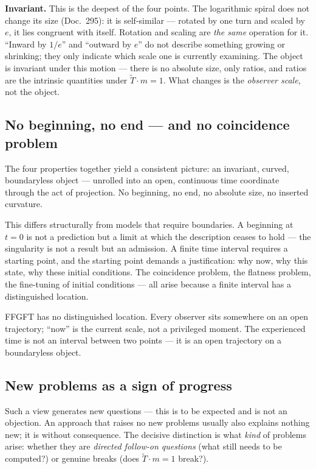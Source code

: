 \textbf{Invariant.} This is the deepest of the four points. The logarithmic
spiral does not change its size (Doc.~295): it is self-similar --- rotated by
one turn and scaled by $e$, it lies congruent with itself. Rotation and
scaling are \emph{the same} operation for it. \enquote{Inward by $1/e$} and
\enquote{outward by $e$} do not describe something growing or shrinking; they
only indicate which scale one is currently examining. The object is invariant
under this motion --- there is no absolute size, only ratios, and ratios are
the intrinsic quantities under $\tilde{T} \cdot m = 1$. What changes is the
\emph{observer scale}, not the object.

\subsection*{No beginning, no end --- and no coincidence problem}

The four properties together yield a consistent picture: an invariant, curved,
boundaryless object --- unrolled into an open, continuous time coordinate
through the act of projection. No beginning, no end, no absolute size, no
inserted curvature.

This differs structurally from models that require boundaries. A beginning at
$t = 0$ is not a prediction but a limit at which the description ceases to
hold --- the singularity is not a result but an admission. A finite time
interval requires a starting point, and the starting point demands a
justification: why now, why this state, why these initial conditions. The
coincidence problem, the flatness problem, the fine-tuning of initial
conditions --- all arise because a finite interval has a distinguished location.

FFGFT has no distinguished location. Every observer sits somewhere on an open
trajectory; \enquote{now} is the current scale, not a privileged moment. The
experienced time is not an interval between two points --- it is an open
trajectory on a boundaryless object.

\subsection*{New problems as a sign of progress}

Such a view generates new questions --- this is to be expected and is not an
objection. An approach that raises no new problems usually also explains
nothing new; it is without consequence. The decisive distinction is what
\emph{kind} of problems arise: whether they are \emph{directed follow-on
questions} (what still needs to be computed?) or genuine breaks (does
$\tilde{T} \cdot m = 1$ break?).


